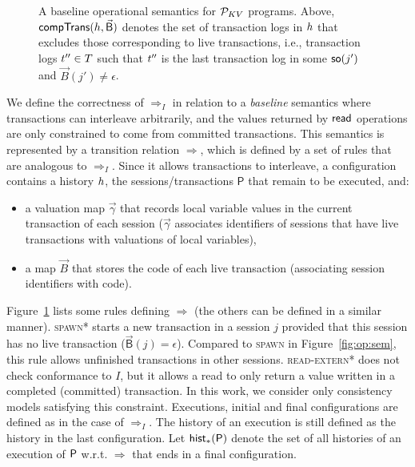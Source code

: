 \begin{figure} [t]
\begin{mathpar}
  \end{mathpar}
 \vspace{-4mm}
  \caption{A baseline operational semantics for $\KVProgs$ programs. Above, $\transC{\hist,\vec{\mathsf{B}}}$ denotes the set of transaction logs in $\hist$ that excludes those corresponding to live transactions, i.e., transaction logs $\tr''\in T$ such that $\tr''$ is the last transaction log in some $\so(j')$ and $\vec{B}(j')\neq\epsilon$.}
  \label{fig:op:sem:baseline}
 \vspace{-4mm}
\end{figure}

We define the correctness of $\Rightarrow_I$ in relation to a \emph{baseline} semantics where transactions can interleave arbitrarily, and the values returned by $\rdo$ operations are only constrained to come from committed transactions. 
This semantics is represented by a transition relation $\Rightarrow$, which is defined by a set of rules that are analogous to $\Rightarrow_I$. 
Since it allows transactions to interleave, a configuration contains a history $\hist$, the sessions/transactions $\mathsf{P}$ that remain to be executed, and:
\begin{itemize}
	\item a valuation map $\vec{\gamma}$ that records local variable values in the current transaction of each session ($\vec{\gamma}$ associates identifiers of sessions that have live transactions with valuations of local variables),
	\item a map $\vec{B}$ that stores the code of each live transaction (associating session identifiers with code).
\end{itemize}
Figure~\ref{fig:op:sem:baseline} lists some rules defining $\Rightarrow$ (the others can be defined in a similar manner). \textsc{spawn*} starts a new transaction in a session $j$ provided that this session has no live transaction ($\vec{\mathsf{B}}(j) = \epsilon$). Compared to \textsc{spawn} in Figure~\ref{fig:op:sem}, this rule allows unfinished transactions in other sessions. \textsc{read-extern*} does not check conformance to $I$, but it allows a read to only return a value written in a completed (committed) transaction. In this work, we consider only consistency models satisfying this constraint. Executions, initial and final configurations are defined as in the case of $\Rightarrow_I$. The history of an execution is still defined as the history in the last configuration. Let $\histOf[*]{\prog}$ denote the set of all histories of an execution of $\prog$ w.r.t. $\Rightarrow$ that ends in a final configuration.

